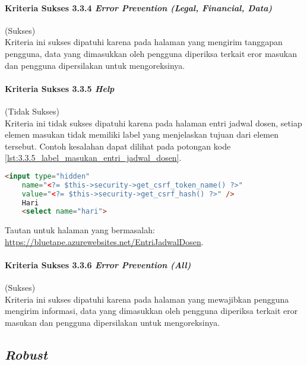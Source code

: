 \paragraph{Kriteria Sukses 3.3.4 \textit{Error Prevention (Legal, Financial, Data)\\}}
\label{par:kepatuhan_bluetape_kriteria_sukses_3.3.4}
(Sukses)\\

Kriteria ini sukses dipatuhi karena pada halaman yang mengirim tanggapan pengguna, data yang dimasukkan oleh pengguna diperiksa terkait eror masukan dan pengguna dipersilakan untuk mengoreksinya.

\paragraph{Kriteria Sukses 3.3.5 \textit{Help}}
\label{par:kepatuhan_bluetape_kriteria_sukses_3.3.5}
(Tidak Sukses)\\

Kriteria ini tidak sukses dipatuhi karena pada halaman entri jadwal dosen, setiap elemen masukan tidak memiliki label yang menjelaskan tujuan dari elemen tersebut. Contoh kesalahan dapat dilihat pada potongan kode \ref{lst:3.3.5_label_masukan_entri_jadwal_dosen}.

\begin{lstlisting}[frame=single, label={lst:3.3.5_label_masukan_entri_jadwal_dosen}, language=HTML, caption=Kriteria Sukses 3.3.5 - Tidak Terdapat Label pada Kolom Masukan di Halaman Entri Jadwal Dosen]
    <input type="hidden" 
    name="<?= $this->security->get_csrf_token_name() ?>"
    value="<?= $this->security->get_csrf_hash() ?>" />
    Hari
    <select name="hari">
\end{lstlisting}
Tautan untuk halaman yang bermasalah: \url{https://bluetape.azurewebsites.net/EntriJadwalDosen}.

\paragraph{Kriteria Sukses 3.3.6 \textit{Error Prevention (All)}}
\label{par:kepatuhan_bluetape_kriteria_sukses_3.3.6}
(Sukses)\\

Kriteria ini sukses dipatuhi karena pada halaman yang mewajibkan pengguna mengirim informasi, data yang dimasukkan oleh pengguna diperiksa terkait eror masukan dan pengguna dipersilakan untuk mengoreksinya.

\subsection{\textit{Robust}}
\label{subsec:kepatuhan_bluetape_robust}

